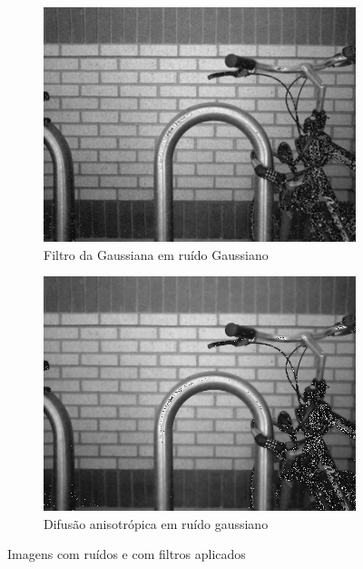 \documentclass[10pt,a4paper]{article}
\begin{document}
\begin{figure}[!ht]
\begin{subfigure}[ht]{0.45\textwidth}
        \includegraphics[width=\textwidth]{ga_gaussian.jpg}
        \caption{Filtro da Gaussiana em ruído Gaussiano}
    \end{subfigure}
    \qquad
    \begin{subfigure}[ht]{0.45\textwidth}
        \includegraphics[width=\textwidth]{ga_aniso.jpg}
        \caption{Difusão anisotrópica em ruído gaussiano}
    \end{subfigure}
    \caption{Imagens com ruídos e com filtros aplicados}
    \label{fig:all}
\end{figure}
\end{document}
